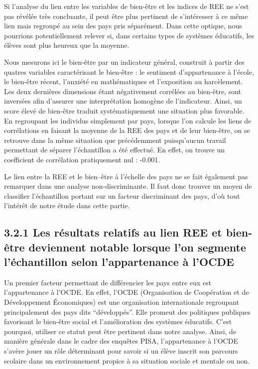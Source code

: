 \documentclass[
  french,
  11pt,
  a4paper,
  oneside]{report}
\begin{document}
Si l'analyse du lien entre les variables de bien-être et les indices de
REE ne s'est pas révélée très concluante, il peut être plus pertinent de
s'intéresser à ce même lien mais regroupé au sein des pays pris
séparément. Dans cette optique, nous pourrions potentiellement relever
si, dans certains types de systèmes éducatifs, les élèves sont plus
heureux que la moyenne.

Nous mesurons ici le bien-être par un indicateur général, construit à
partir des quatres variables caractérisant le bien-être : le sentiment
d'appartenance à l'école, le bien-être récent, l'anxiété en
mathématiques et l'exposition au harcèlement. Les deux dernières
dimensions étant négativement corrélées au bien-être, sont inversées
afin d'assurer une interprétation homogène de l'indicateur. Ainsi, un
score élevé de bien-être traduit systématiquement une situation plus
favorable. En regroupant les individus simplement par pays, lorsque l'on
calcule les liens de corrélations en faisant la moyenne de la REE des
pays et de leur bien-être, on se retrouve dans la même situation que
précédemment puisqu'aucun travail permettant de séparer l'échantillon a
été effectué. En effet, on trouve un coefficient de corrélation
pratiquement nul : -0.001.

Le lien entre la REE et le bien--être à l'échelle des pays ne se fait
également pas remarquer dans une analyse non-discriminante. Il faut donc
trouver un moyen de classifier l'échantillon portant sur un facteur
discriminant des pays, d'où tout l'intérêt de notre étude dans cette
partie.

\subsection{3.2.1 Les résultats relatifs au lien REE et bien-être
deviennent notable lorsque l'on segmente l'échantillon selon
l'appartenance à
l'OCDE}\label{les-ruxe9sultats-relatifs-au-lien-ree-et-bien-uxeatre-deviennent-notable-lorsque-lon-segmente-luxe9chantillon-selon-lappartenance-uxe0-locde}

Un premier facteur permettant de différencier les pays entre eux est
l'appartenance à l'OCDE. En effet, l'OCDE (Organisation de Coopération
et de Développement Économiques) est une organisation internationale
regroupant principalement des pays dits ``développés''. Elle promeut des
politiques publiques favorisant le bien-être social et l'amélioration
des systèmes éducatifs. C'est pourquoi, utiliser ce statut peut être
pertinent dans notre analyse. Ainsi, de manière générale dans le cadre
des enquêtes PISA, l'appartenance à l'OCDE s'avère jouer un rôle
déterminant pour savoir si un élève inscrit son parcours scolaire dans
un environnement propice à sa situation sociale et mentale ou non.
\end{document}
